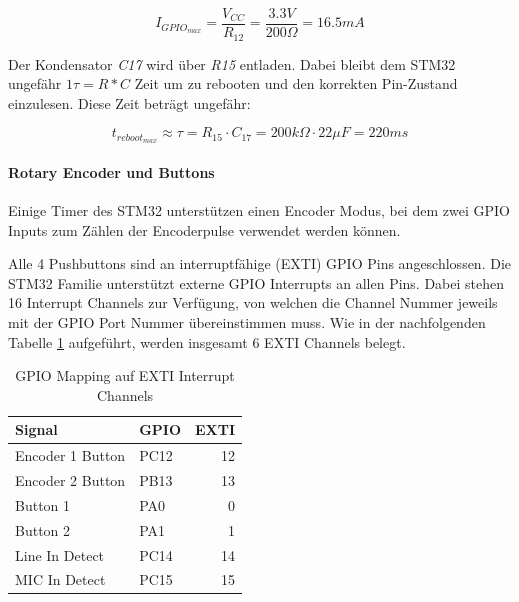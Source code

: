 \begin{equation}
I_{GPIO_{max}}=\frac{V_{CC}}{R_{12}}=\frac{3.3\si{V}}{200\si{\Omega}}=16.5\si{mA}
\end{equation}

Der Kondensator \textit{C17} wird über \textit{R15} entladen. Dabei bleibt dem STM32 ungefähr $1\tau=R*C$ Zeit um zu rebooten und den korrekten Pin-Zustand einzulesen. Diese Zeit beträgt ungefähr:

\begin{equation}
t_{reboot_{max}} \approx \tau = R_{15}\cdot C_{17} = 200\si{k\Omega}\cdot 22\si{\mu F}=220\si{ms}
\end{equation}


\paragraph{Rotary Encoder und Buttons}

Einige Timer des STM32 unterstützen einen Encoder Modus, bei dem zwei GPIO Inputs zum Zählen der Encoderpulse verwendet werden können.

Alle 4 Pushbuttons sind an interruptfähige (EXTI) GPIO Pins angeschlossen. 
Die STM32 Familie unterstützt externe GPIO Interrupts an allen Pins. 
Dabei stehen 16 Interrupt Channels zur Verfügung, von welchen die Channel Nummer jeweils mit der GPIO Port Nummer übereinstimmen muss. 
Wie in der nachfolgenden Tabelle \ref{tab:EXTIPins} aufgeführt, werden insgesamt 6 EXTI Channels belegt.

\begin{table}[H]
	\centering
	\begin{tabular}{|l|l|r|}
	\hline
	\textbf{Signal}  & \textbf{GPIO} & \textbf{EXTI} \\ \hline
	Encoder 1 Button & PC12          & 12            \\ \hline
	Encoder 2 Button & PB13          & 13            \\ \hline
	Button 1         & PA0           & 0             \\ \hline
	Button 2         & PA1           & 1             \\ \hline
	Line In Detect   & PC14          & 14            \\ \hline
	MIC In Detect    & PC15          & 15            \\ \hline
	\end{tabular}
	\caption{GPIO Mapping auf EXTI Interrupt Channels}
	\label{tab:EXTIPins}
\end{table}




